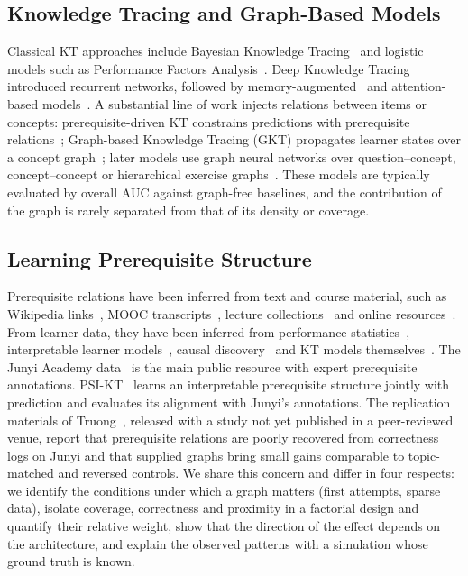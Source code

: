 \documentclass[lettersize,journal]{IEEEtran}
\begin{document}
\subsection{Knowledge Tracing and Graph-Based Models}
Classical KT approaches include Bayesian Knowledge Tracing~\cite{corbett1994knowledge} and logistic models such as Performance Factors Analysis~\cite{pavlik2009performance}. Deep Knowledge Tracing~\cite{piech2015deep} introduced recurrent networks, followed by memory-augmented~\cite{zhang2017dynamic} and attention-based models~\cite{pandey2019self,ghosh2020context}. A substantial line of work injects relations between items or concepts: prerequisite-driven KT constrains predictions with prerequisite relations~\cite{chen2018prerequisite}; Graph-based Knowledge Tracing (GKT) propagates learner states over a concept graph~\cite{nakagawa2019graph}; later models use graph neural networks over question--concept, concept--concept or hierarchical exercise graphs~\cite{yang2020gikt,tong2020structure,tong2022introducing}. These models are typically evaluated by overall AUC against graph-free baselines, and the contribution of the graph is rarely separated from that of its density or coverage.

\subsection{Learning Prerequisite Structure}
Prerequisite relations have been inferred from text and course material, such as Wikipedia links~\cite{liang2015measuring}, MOOC transcripts~\cite{pan2017prerequisite}, lecture collections~\cite{li2019lecturebank} and online resources~\cite{roy2019inferring}. From learner data, they have been inferred from performance statistics~\cite{vuong2011method,scheines2014discovering}, interpretable learner models~\cite{allegre2023discovering}, causal discovery~\cite{yu2024causal} and KT models themselves~\cite{tong2020structure,zhou2024predictive}. The Junyi Academy data~\cite{chang2015modeling} is the main public resource with expert prerequisite annotations. PSI-KT~\cite{zhou2024predictive} learns an interpretable prerequisite structure jointly with prediction and evaluates its alignment with Junyi's annotations. The replication materials of Truong~\cite{truong2026replication}, released with a study not yet published in a peer-reviewed venue, report that prerequisite relations are poorly recovered from correctness logs on Junyi and that supplied graphs bring small gains comparable to topic-matched and reversed controls. We share this concern and differ in four respects: we identify the conditions under which a graph matters (first attempts, sparse data), isolate coverage, correctness and proximity in a factorial design and quantify their relative weight, show that the direction of the effect depends on the architecture, and explain the observed patterns with a simulation whose ground truth is known.
\end{document}
